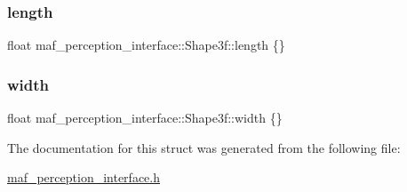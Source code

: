\subsubsection{\texorpdfstring{length}{length}}
{\footnotesize\ttfamily float maf\+\_\+perception\+\_\+interface\+::\+Shape3f\+::length \{\}}

\mbox{\label{structmaf__perception__interface_1_1Shape3f_a1a8b92bd677a9ec11aa6aa80b1269592}} 
\subsubsection{\texorpdfstring{width}{width}}
{\footnotesize\ttfamily float maf\+\_\+perception\+\_\+interface\+::\+Shape3f\+::width \{\}}



The documentation for this struct was generated from the following file\+:\begin{DoxyCompactItemize}
\item 
\hyperlink{maf__perception__interface_8h}{maf\+\_\+perception\+\_\+interface.\+h}\end{DoxyCompactItemize}

